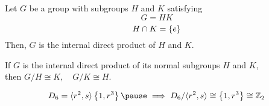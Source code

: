 
\begin{frame}{}
\end{frame}

\begin{frame}
  \begin{definition}
	Let $G$ be a group with  subgroups $H$ and $K$ satisfying
	\[
	  G = HK
	\]
	\[
	  H \cap K = \left\{e\right\}
	\]
	Then, $G$ is the internal direct product of $H$ and $K$.
  \end{definition}


\end{frame}

\begin{frame}
  \begin{theorem}
	\begin{center}
	  If $G$ is the internal direct product of its normal subgroups $H$ and $K$, \\[5pt]
	  then $G/H \cong K, \quad G/K \cong H$.	
	\end{center}
  \end{theorem}

  \pause
  \[
	D_6 = \langle r^2, s \rangle \set{1, r^3} \pause \implies D_6/\langle r^2, s \rangle \cong \set{1, r^3} \cong \z_{2}
  \]


\end{frame}
